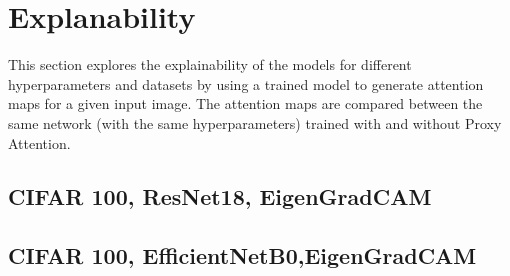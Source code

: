 \section{Explanability}
This section explores the explainability of the models for different hyperparameters and datasets by using a trained model to generate attention maps for a given input image. The attention maps are compared between the same network (with the same hyperparameters) trained with and without Proxy Attention.

\subsection{CIFAR 100, ResNet18, EigenGradCAM}


\subsection{CIFAR 100, EfficientNetB0,EigenGradCAM}
